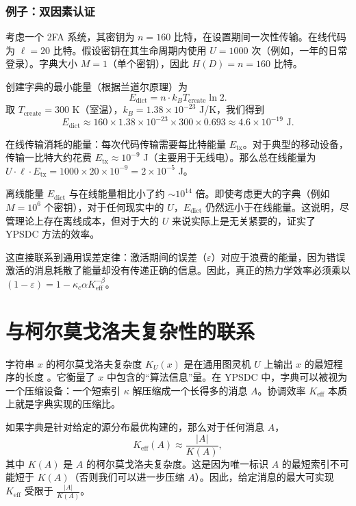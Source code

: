 \documentclass[12pt,a4paper]{article}
\theoremstyle{remark}
\newcommand{\Keff}{K_{\mathrm{eff}}}
\begin{document}
	\subsubsection{例子：双因素认证}
	考虑一个 2FA 系统，其密钥为 $n = 160$ 比特，在设置期间一次性传输。在线代码为 $\ell = 20$ 比特。假设密钥在其生命周期内使用 $U = 1000$ 次（例如，一年的日常登录）。字典大小 $M = 1$（单个密钥），因此 $H(D) = n = 160$ 比特。
	
	创建字典的最小能量（根据兰道尔原理）为
	\[
	E_{\text{dict}} = n \cdot k_B T_{\text{create}} \ln 2.
	\]
	取 $T_{\text{create}} = 300$ K（室温），$k_B = 1.38 \times 10^{-23}$ J/K，我们得到
	\[
	E_{\text{dict}} \approx 160 \times 1.38 \times 10^{-23} \times 300 \times 0.693 \approx 4.6 \times 10^{-19} \text{ J}.
	\]
	
	在线传输消耗的能量：每次代码传输需要每比特能量 $E_{\text{tx}}$。对于典型的移动设备，传输一比特大约花费 $E_{\text{tx}} \approx 10^{-9}$ J（主要用于无线电）。那么总在线能量为 $U \cdot \ell \cdot E_{\text{tx}} = 1000 \times 20 \times 10^{-9} = 2 \times 10^{-5}$ J。
	
	离线能量 $E_{\text{dict}}$ 与在线能量相比小了约 $\sim 10^{14}$ 倍。即使考虑更大的字典（例如 $M = 10^6$ 个密钥），对于任何现实中的 $U$，$E_{\text{dict}}$ 仍然远小于在线能量。这说明，尽管理论上存在离线成本，但对于大的 $U$ 来说实际上是无关紧要的，证实了 YPSDC 方法的效率。
	
	这直接联系到通用误差定律：激活期间的误差（$\varepsilon$）对应于浪费的能量，因为错误激活的消息耗散了能量却没有传递正确的信息。因此，真正的热力学效率必须乘以 $(1-\varepsilon) = 1 - \kappa_c\alpha K_{\mathrm{eff}}^{-\beta}$。
	
	\section{与柯尔莫戈洛夫复杂性的联系}
	\label{sec:kolmogorov}
	
	字符串 $x$ 的柯尔莫戈洛夫复杂度 $K_U(x)$ 是在通用图灵机 $U$ 上输出 $x$ 的最短程序的长度 \cite{Kolmogorov1965}。它衡量了 $x$ 中包含的“算法信息”量。在 YPSDC 中，字典可以被视为一个压缩设备：一个短索引 $\kappa$ 解压缩成一个长得多的消息 $A$。协调效率 $\Keff$ 本质上就是字典实现的压缩比。
	
	如果字典是针对给定的源分布最优构建的，那么对于任何消息 $A$，
	\begin{equation}
		\Keff(A) \approx \frac{|A|}{K(A)}, \label{eq:kolmogorov}
	\end{equation}
	其中 $K(A)$ 是 $A$ 的柯尔莫戈洛夫复杂度。这是因为唯一标识 $A$ 的最短索引不可能短于 $K(A)$（否则我们可以进一步压缩 $A$）。因此，给定消息的最大可实现 $\Keff$ 受限于 $\frac{|A|}{K(A)}$。
	
\end{document}
